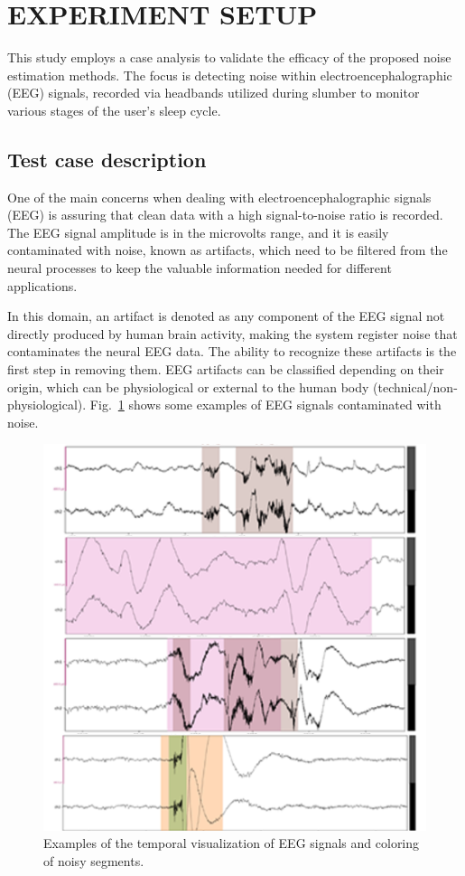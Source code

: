 \documentclass[conference]{IEEEtran}
\begin{document}
\section{EXPERIMENT SETUP}
\label{sec:exp}

This study employs a case analysis to validate the efficacy of the proposed noise estimation methods. The focus is detecting noise within electroencephalographic (EEG) signals, recorded via headbands utilized during slumber to monitor various stages of the user's sleep cycle.
\subsection{Test case description} One of the main concerns when dealing with electroencephalographic signals (EEG) is assuring that clean data with a high signal-to-noise ratio is recorded. The EEG signal amplitude is in the microvolts range, and it is easily contaminated with noise, known as artifacts, which need to be filtered from the neural processes to keep the valuable information needed for different applications.

In this domain, an artifact is denoted as any component of the EEG signal not directly produced by human brain activity, making the system register noise that contaminates the neural EEG data. The ability to recognize these artifacts is the first step in removing them. EEG artifacts can be classified depending on their origin, which can be physiological or external to the human body (technical/non-physiological). Fig.~\ref{fig:Fig1}  shows some examples of EEG signals contaminated with noise.

\begin{figure}
    \centering
    \includegraphics[width=0.95\columnwidth]{images/Fig1n.png}     
    \vspace{-0.1in}
    \caption{\label{fig:Fig1} Examples of the temporal visualization of EEG signals and coloring of noisy segments.}
\end{figure}
\end{document}
